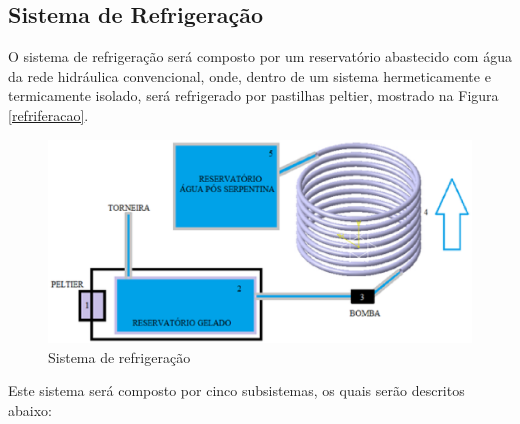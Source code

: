 \subsection{Sistema de Refrigeração}

O sistema de refrigeração será composto por um reservatório abastecido com água da rede hidráulica convencional, onde, dentro de um sistema hermeticamente e termicamente isolado, será refrigerado por pastilhas peltier, mostrado na Figura \ref{refriferacao}.

\begin{figure}[h]
 \centering
 \includegraphics[keepaspectratio=true,scale=0.6]{figuras/refrigeracao.eps}
 \caption{Sistema de refrigeração}
 \label{refrigeracao}
\end{figure}


Este sistema será composto por cinco subsistemas, os quais serão descritos abaixo:

